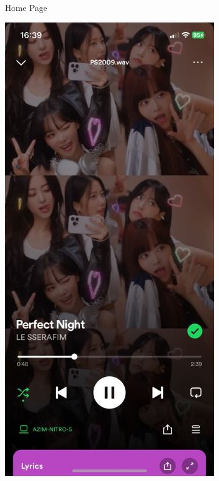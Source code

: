 \begin{figure} [h]
\begin{subfigure}{.3\linewidth}
      \caption{Home Page}
      \label{fig:myfig17}
    \end{subfigure}%
    \hspace{1em}%
    \begin{subfigure}{.3\linewidth}
      \centering
      \includegraphics[width = \linewidth]{mainmatter/images/spotify2.jpg}

\end{subfigure}
\end{figure}
